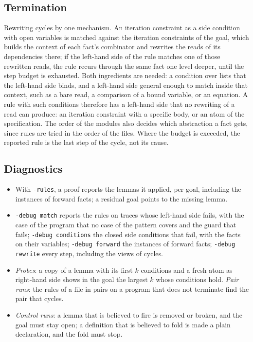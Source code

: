 \subsection{Termination}\label{sec:principles:termination}
Rewriting cycles by one mechanism. An iteration constraint as a side condition with open variables is matched against
the iteration constraints of the goal, which builds the context of each fact's combinator and rewrites the reads of
its dependencies there; if the left-hand side of the rule matches one of those rewritten reads, the rule recurs through
the same fact one level deeper, until the step budget is exhausted. Both ingredients are needed: a condition over lists
that the left-hand side binds, and a left-hand side general enough to match inside that context, such as a bare read,
a comparison of a bound variable, or an equation. A rule with such conditions therefore has a left-hand side that no
rewriting of a read can produce: an iteration constraint with a specific body, or an atom of the specification. The
order of the modules also decides which abstraction a fact gets, since rules are tried in the order of the files.
Where the budget is exceeded, the reported rule is the last step of the cycle, not its cause.

\subsection{Diagnostics}\label{sec:principles:diag}
\begin{itemize}[nosep]
\item With \texttt{-rules}, a proof reports the lemmas it applied, per goal, including the instances of forward facts;
  a residual goal points to the missing lemma.
\item \texttt{-debug match} reports the rules on traces whose left-hand side fails, with the case of the program that no
  case of the pattern covers and the guard that fails; \texttt{-debug conditions} the closed side conditions that fail,
  with the facts on their variables; \texttt{-debug forward} the instances of forward facts; \texttt{-debug rewrite}
  every step, including the views of cycles.
\item \emph{Probes}: a copy of a lemma with its first $k$ conditions and a fresh atom as right-hand side shows in the goal
  the largest $k$ whose conditions hold. \emph{Pair runs}: the rules of a file in pairs on a program that does not
  terminate find the pair that cycles.
\item \emph{Control runs}: a lemma that is believed to fire is removed or broken, and the goal must stay open; a
  definition that is believed to fold is made a plain declaration, and the fold must stop.
\end{itemize}

